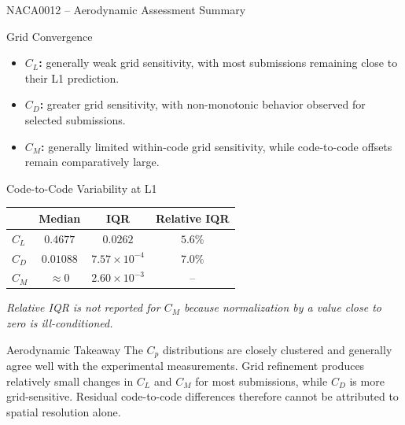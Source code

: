 \begin{frame}{\small NACA0012 -- Aerodynamic Assessment Summary}
\scriptsize

\begin{block}{\scriptsize Grid Convergence}
\begin{itemize}
    \item \textbf{$C_L$:} generally weak grid sensitivity, with most submissions remaining close to their L1 prediction.
    \item \textbf{$C_D$:} greater grid sensitivity, with non-monotonic behavior observed for selected submissions.
    \item \textbf{$C_M$:} generally limited within-code grid sensitivity, while code-to-code offsets remain comparatively large.
\end{itemize}
\end{block}

\vspace{0.15cm}

\begin{block}{\scriptsize Code-to-Code Variability at L1}
\begin{center}
\begin{tabular}{lccc}
\toprule
 & \textbf{Median} & \textbf{IQR} & \textbf{Relative IQR} \\
\midrule
$C_L$ & $0.4677$    & $0.0262$                & $5.6\%$ \\
$C_D$ & $0.01088$   & $7.57\times10^{-4}$     & $7.0\%$ \\
$C_M$ & $\approx 0$ & $2.60\times10^{-3}$     & -- \\
\bottomrule
\end{tabular}
\end{center}

\vspace{0.05cm}

\centering
\textit{Relative IQR is not reported for $C_M$ because normalization by a value close to zero is ill-conditioned.}
\end{block}

\vspace{0.15cm}

\begin{alertblock}{\scriptsize Aerodynamic Takeaway}
The $C_p$ distributions are closely clustered and generally agree well with the experimental measurements. Grid refinement produces relatively small changes in $C_L$ and $C_M$ for most submissions, while $C_D$ is more grid-sensitive. Residual code-to-code differences therefore cannot be attributed to spatial resolution alone.
\end{alertblock}

\end{frame}



